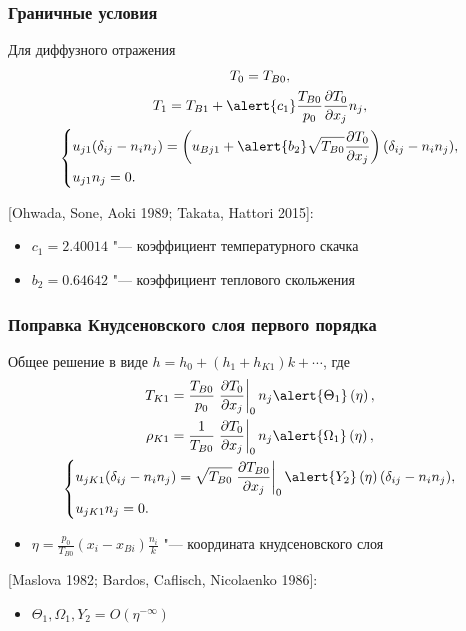 \documentclass[mathserif]{beamer} %
\newcommand{\pder}[2][]{\frac{\partial#1}{\partial#2}}
\newcommand{\OO}[1]{O(#1)}
\begin{document}
\begin{frame}
    \frametitle{Граничные условия}
    Для диффузного отражения
    \begin{gather}
        T_0 = T_{B0}, \label{eq:bc_T0} \\
        T_1 = T_{B1} + \alert{c_1} \frac{T_{B0}}{p_0}\pder[T_0]{x_j} n_j, \label{eq:bc_T1} \\
        \left\{
        \begin{aligned}
            & u_{j1} (\delta_{ij}-n_in_j) =
                \left(u_{Bj1} + \alert{b_2} \sqrt{T_{B0}} \pder[T_0]{x_j}\right) (\delta_{ij}-n_in_j), \\
            & u_{j1} n_j = 0.
        \end{aligned}
        \right. \label{eq:bc_u1}
    \end{gather}
    \vspace{10pt}

    [Ohwada, Sone, Aoki 1989; Takata, Hattori 2015]:
    \begin{itemize}
        \item \(c_1 = 2.40014\) "--- коэффициент температурного скачка
        \item \(b_2 = 0.64642\) "--- коэффициент теплового скольжения
    \end{itemize}
\end{frame}

\begin{frame}
    \frametitle{Поправка Кнудсеновского слоя первого порядка}
    Общее решение в виде \(h = h_0 + (h_1 + h_{K1})k + \cdots\), где
    \begin{gather}
        T_{K1} = \frac{T_{B0}}{p_0}\left.\pder[T_0]{x_j}\right|_0 n_j
            \alert{ \Theta_1 }\left(\eta\right), \label{eq:correction_T} \\
        \rho_{K1} = \frac1{T_{B0}}\left.\pder[T_0]{x_j}\right|_0 n_j
            \alert{ \Omega_1 }\left(\eta\right), \label{eq:correction_rho} \\
        \left\{
        \begin{aligned}
            & u_{jK1} (\delta_{ij}-n_in_j) =
                \sqrt{T_{B0}} \left.\pder[T_{B0}]{x_j}\right|_0
                \alert{ Y_2 }\left(\eta\right) (\delta_{ij}-n_in_j), \\
            & u_{jK1} n_j = 0.
        \end{aligned}
        \right. \label{eq:correction_u}
    \end{gather}
    \vspace{-20pt}
    \begin{itemize}
        \item \(\eta = \frac{p_0}{T_{B0}}(x_i-x_{Bi})\frac{n_i}k\) "--- координата кнудсеновского слоя
    \end{itemize}
    [Maslova 1982; Bardos, Caflisch, Nicolaenko 1986]:
    \begin{itemize}
        \item \(\Theta_1, \Omega_1, Y_2 = \OO{\eta^{-\infty}}\)
    \end{itemize}
\end{frame}
\end{document}
